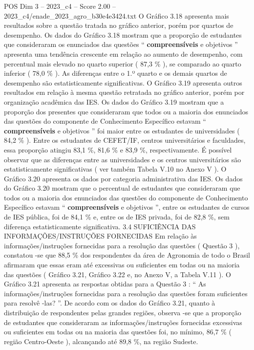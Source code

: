 \begin{textsample}{POS Dim 3 – 2023\_c4 – Score 2.00 – 2023\_c4/enade\_2023\_agro\_b30e4e3424.txt}
O Gráfico 3.18 apresenta mais resultados sobre a questão tratada no gráfico anterior, porém por quartos de desempenho.
Os dados do Gráfico 3.18 mostram que a proporção de estudantes que consideraram os enunciados das questões “ \textbf{compreensíveis} e objetivos ” apresenta uma tendência crescente em relação ao aumento de desempenho, com percentual mais elevado no quarto superior ( 87,3 \% ), se comparado ao quarto inferior ( 78,0 \% ).
As diferenças entre o 1.º quarto e os demais quartos de desempenho são estatisticamente significativas.
O Gráfico 3.19 apresenta outros resultados em relação à mesma questão retratada no gráfico anterior, porém por organização acadêmica das IES.
Os dados do Gráfico 3.19 mostram que a proporção dos presentes que consideraram que todos ou a maioria dos enunciados das questões do componente de Conhecimento Específico estavam “ \textbf{compreensíveis} e objetivos ” foi maior entre os estudantes de universidades ( 84,2 \% ).
Entre os estudantes de CEFET/IF, centros universitários e faculdades, essa proporção atingiu 83,1 \%, 81,6 \% e 83,9 \%, respectivamente.
É possível observar que as diferenças entre as universidades e os centros universitários são estatisticamente significativas ( ver também Tabela V.10 no Anexo V ).
O Gráfico 3.20 apresenta os dados por categoria administrativa das IES.
Os dados do Gráfico 3.20 mostram que o percentual de estudantes que consideraram que todos ou a maioria dos enunciados das questões do componente de Conhecimento Específico estavam “ \textbf{compreensíveis} e objetivos ”, entre os estudantes de cursos de IES pública, foi de 84,1 \% e, entre os de IES privada, foi de 82,8 \%, sem diferença estatisticamente significativa. 3.4 SUFICIÊNCIA DAS INFORMAÇÕES/INSTRUÇÕES FORNECIDAS Em relação às informações/instruções fornecidas para a resolução das questões ( Questão 3 ), constatou -se que 88,5 \% dos respondentes da área de Agronomia de todo o Brasil afirmaram que essas eram até excessivas ou suficientes em todas ou na maioria das questões ( Gráfico 3.21, Gráfico 3.22 e, no Anexo V, a Tabela V.11 ).
O Gráfico 3.21 apresenta as respostas obtidas para a Questão 3 : “ As informações/instruções fornecidas para a resolução das questões foram suficientes para resolvê -las? ”.
De acordo com os dados do Gráfico 3.21, quanto à distribuição de respondentes pelas grandes regiões, observa -se que a proporção de estudantes que consideraram as informações/instruções fornecidas excessivas ou suficientes em todas ou na maioria das questões foi, no mínimo, 86,7 \% ( região Centro-Oeste ), alcançando até 89,8 \%, na região Sudeste.

\end{textsample}
